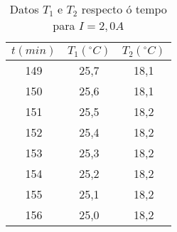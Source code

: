 \documentclass[12pt, a4paper, titlepage]{article}
\begin{document}
\begin{table}[H]
\begin{minipage}[c]{0,24\textwidth}
\begin{table}[H]
{\begin{tabular}{|c|c|c|}
        \hline
        $t (min)$ & $T_1 (^\circ C)$ & $T_2 (^\circ C)$ \\ \hline
        149 & 25,7 & 18,1 \\ \hline
        150 & 25,6 & 18,1 \\ \hline
        151 & 25,5 & 18,2 \\ \hline
        152 & 25,4 & 18,2 \\ \hline
        153 & 25,3 & 18,2 \\ \hline
        154 & 25,2 & 18,2 \\ \hline
        155 & 25,1 & 18,2 \\ \hline
        156 & 25,0 & 18,2 \\ \hline
        \end{tabular}}
        \end{table}
    \end{minipage}
    \begin{minipage}[c]{0,24\textwidth}
      \begin{table}[H]
        \end{table}
    \end{minipage}
    \caption{Datos $T_1$ e $T_2$ respecto ó tempo para $I = 2,0A$}
    \label{cad:t_i_20}
  \end{table}
\end{document}
